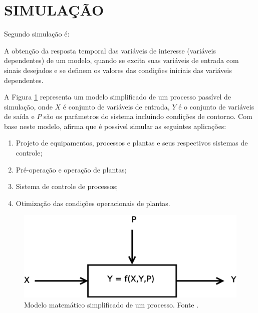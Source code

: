 \section{SIMULAÇÃO} 

Segundo  simulação é:

\begin{citacao}
A obtenção da resposta temporal das variáveis de interesse (variáveis dependentes) de um modelo, quando se excita suas variáveis de entrada com sinais desejados e se definem os valores das condições iniciais das variáveis dependentes.
\end{citacao}

A Figura \ref{simulacao} representa um modelo simplificado de um processo passível de simulação, onde $X$ é conjunto de variáveis de entrada, $Y$ é o conjunto de variáveis de saída e $P$ são os parâmetros do sistema incluindo condições de contorno. 
Com base neste modelo,  afirma que é possível simular as seguintes aplicações:
\begin{enumerate}
	\item Projeto de equipamentos, processos e plantas e seus respectivos sistemas de controle;
	\item Pré-operação e operação de plantas;
	\item Sistema de controle de processos;
	\item Otimização das condições operacionais de plantas.
\end{enumerate}


\begin{figure}[ht]
	\centering
	\includegraphics[width=10 cm]{figuras/simulacao.eps}
	\caption{Modelo matemático simplificado de um processo. Fonte \cite{Garcia2009b}.}
    	\label{simulacao}
\end{figure}
